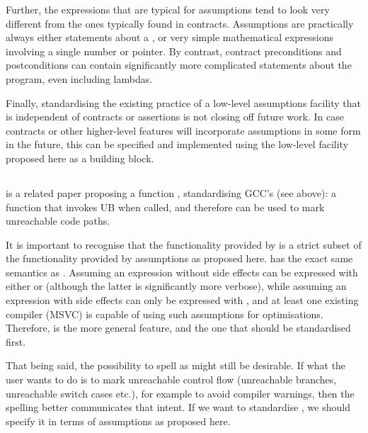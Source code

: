 Further, the expressions that are typical for assumptions tend to look very different from the ones typically found in contracts. Assumptions are practically always either statements about a , or very simple mathematical expressions involving a single number or pointer. By contrast, contract preconditions and postconditions can contain significantly more complicated statements about the program, even including lambdas.

Finally, standardising the existing practice of a low-level assumptions facility that is independent of contracts or assertions is not closing off future work. In case contracts or other higher-level features will incorporate assumptions in some form in the future, this can be specified and implemented using the low-level facility proposed here as a building block.

\subsection{}

\cite{P0627R6} is a related paper proposing a function , standardising GCC's  (see above): a function that invokes UB when called, and therefore can be used to mark unreachable code paths.

It is important to recognise that the functionality provided by  is a strict subset of the functionality provided by assumptions as proposed here.  has the exact same semantics as . Assuming an expression without side effects can be expressed with either  or  (although the latter is significantly more verbose), while assuming an expression with side effects can only be expressed with , and at least one existing compiler (MSVC) is capable of using such assumptions for optimisations. Therefore,  is the more general feature, and the one that should be standardised first.

That being said, the possibility to spell  as  might still be desirable. If 
what the user wants to do is to mark unreachable control flow (unreachable branches, unreachable switch cases etc.), for example to avoid compiler warnings, then the spelling  better communicates that intent. If we want to standardise , we should specify it in terms of assumptions as proposed here.

